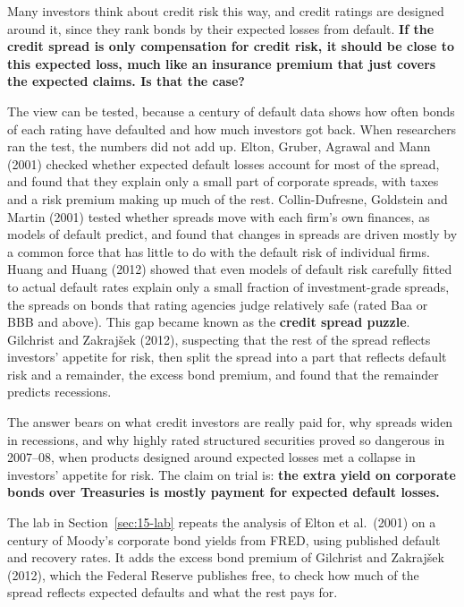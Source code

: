 Many investors think about credit risk this way, and credit ratings are designed around it, since they rank bonds by their expected losses from default.
\textbf{If the credit spread is only compensation for credit risk, it should be close to this expected loss, much like an insurance premium that just covers the expected claims. Is that the case?}


The view can be tested, because a century of default data shows how often bonds of each rating have defaulted and how much investors got back. When researchers ran the test, the numbers did not add up. Elton, Gruber, Agrawal and Mann (2001) checked whether expected default losses account for most of the spread, and found that they explain only a small part of corporate spreads, with taxes and a risk premium making up much of the rest. Collin-Dufresne, Goldstein and Martin (2001) tested whether spreads move with each firm's own finances, as models of default predict, and found that changes in spreads are driven mostly by a common force that has little to do with the default risk of individual firms. Huang and Huang (2012) showed that even models of default risk carefully fitted to actual default rates explain only a small fraction of investment-grade spreads, the spreads on bonds that rating agencies judge relatively safe (rated Baa or BBB and above). This gap became known as the \textbf{credit spread puzzle}. Gilchrist and Zakraj\v{s}ek (2012), suspecting that the rest of the spread reflects investors' appetite for risk, then split the spread into a part that reflects default risk and a remainder, the excess bond premium, and found that the remainder predicts recessions.

The answer bears on what credit investors are really paid for, why spreads widen in recessions, and why highly rated structured securities proved so dangerous in 2007--08, when products designed around expected losses met a collapse in investors' appetite for risk. The claim on trial is: \textbf{the extra yield on corporate bonds over Treasuries is mostly payment for expected default losses.}

The lab in Section~\ref{sec:15-lab} repeats the analysis of Elton et al.\ (2001) on a century of Moody's corporate bond yields from FRED, using published default and recovery rates. It adds the excess bond premium of Gilchrist and Zakraj\v{s}ek (2012), which the Federal Reserve publishes free, to check how much of the spread reflects expected defaults and what the rest pays for.

